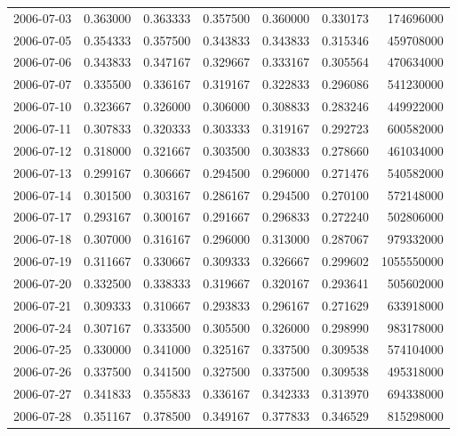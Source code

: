 \begin{tabular}{lrrrrrr}
2006-07-03 &    0.363000 &    0.363333 &    0.357500 &    0.360000 &    0.330173 &   174696000 \\
2006-07-05 &    0.354333 &    0.357500 &    0.343833 &    0.343833 &    0.315346 &   459708000 \\
2006-07-06 &    0.343833 &    0.347167 &    0.329667 &    0.333167 &    0.305564 &   470634000 \\
2006-07-07 &    0.335500 &    0.336167 &    0.319167 &    0.322833 &    0.296086 &   541230000 \\
2006-07-10 &    0.323667 &    0.326000 &    0.306000 &    0.308833 &    0.283246 &   449922000 \\
2006-07-11 &    0.307833 &    0.320333 &    0.303333 &    0.319167 &    0.292723 &   600582000 \\
2006-07-12 &    0.318000 &    0.321667 &    0.303500 &    0.303833 &    0.278660 &   461034000 \\
2006-07-13 &    0.299167 &    0.306667 &    0.294500 &    0.296000 &    0.271476 &   540582000 \\
2006-07-14 &    0.301500 &    0.303167 &    0.286167 &    0.294500 &    0.270100 &   572148000 \\
2006-07-17 &    0.293167 &    0.300167 &    0.291667 &    0.296833 &    0.272240 &   502806000 \\
2006-07-18 &    0.307000 &    0.316167 &    0.296000 &    0.313000 &    0.287067 &   979332000 \\
2006-07-19 &    0.311667 &    0.330667 &    0.309333 &    0.326667 &    0.299602 &  1055550000 \\
2006-07-20 &    0.332500 &    0.338333 &    0.319667 &    0.320167 &    0.293641 &   505602000 \\
2006-07-21 &    0.309333 &    0.310667 &    0.293833 &    0.296167 &    0.271629 &   633918000 \\
2006-07-24 &    0.307167 &    0.333500 &    0.305500 &    0.326000 &    0.298990 &   983178000 \\
2006-07-25 &    0.330000 &    0.341000 &    0.325167 &    0.337500 &    0.309538 &   574104000 \\
2006-07-26 &    0.337500 &    0.341500 &    0.327500 &    0.337500 &    0.309538 &   495318000 \\
2006-07-27 &    0.341833 &    0.355833 &    0.336167 &    0.342333 &    0.313970 &   694338000 \\
2006-07-28 &    0.351167 &    0.378500 &    0.349167 &    0.377833 &    0.346529 &   815298000 \\

\end{tabular}
